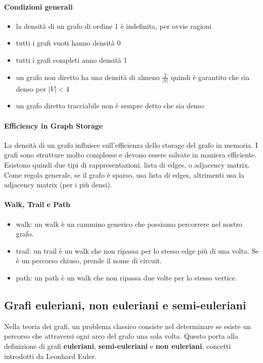 \paragraph*{Condizioni generali}
\begin{itemize}
    \item la densità di un grafo di ordine 1 è indefinita, per ovvie ragioni
    \item tutti i grafi vuoti hanno densità 0
    \item tutti i grafi completi anno densità 1
    \item un grafo non diretto ha una densità di almeno $\frac{2}{|V|}$ quindi è garantito che sia denso per $ |V| < 4$
    \item un grafo diretto tracciabile non è sempre detto che sia denso
\end{itemize}
\paragraph*{Efficiency in Graph Storage}
La densità di un grafo influisce sull'efficienza dello storage del grafo in memoria. I grafi sono strutture molto complesse e devono essere salvate in maniera efficiente. Esistono quindi due tipi di rappresentazioni. lista di edges, o adjacency matrix. Come regola generale, se il grafo è sparso, usa lista di edges, altrimenti usa la adjacency matrix (per i più densi). 
\paragraph*{Walk, Trail e Path}
\begin{itemize}
    \item walk: un walk è un cammino generico che possiamo percorrere nel nostro grafo. 
    \item trail: un trail è un walk che non ripassa per lo stesso edge più di una volta. Se è un percorso chiuso, prende il nome di circuit.
    \item path: un path è un walk che non ripassa due volte per lo stesso vertice.
\end{itemize}

\subsection*{Grafi euleriani, non euleriani e semi-euleriani}

Nella teoria dei grafi, un problema classico consiste nel determinare se esiste un percorso che attraversi ogni arco del grafo una sola volta. Questo porta alla definizione di grafi \textbf{euleriani}, \textbf{semi-euleriani} e \textbf{non euleriani}, concetti introdotti da Leonhard Euler.

